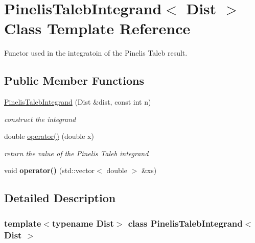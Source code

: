 \hypertarget{classPinelisTalebIntegrand}{}\section{Pinelis\+Taleb\+Integrand$<$ Dist $>$ Class Template Reference}
\label{classPinelisTalebIntegrand}


Functor used in the integratoin of the Pinelis Taleb result.  


\subsection*{Public Member Functions}
\begin{DoxyCompactItemize}
\item 
\mbox{\hyperlink{classPinelisTalebIntegrand_a4122d67af083c9b7f38cc94ed85e99f7}{Pinelis\+Taleb\+Integrand}} (Dist \&dist, const int n)
\begin{DoxyCompactList}\small\item\em construct the integrand \end{DoxyCompactList}\item 
\mbox{\label{classPinelisTalebIntegrand_a065e7c917d79d417efaf2185a343031d}} 
double \mbox{\hyperlink{classPinelisTalebIntegrand_a065e7c917d79d417efaf2185a343031d}{operator()}} (double x)
\begin{DoxyCompactList}\small\item\em return the value of the Pinelis Taleb integrand \end{DoxyCompactList}\item 
\mbox{\label{classPinelisTalebIntegrand_a2c46e6c2f8b63b6deb45b8be5c1b81e5}} 
void {\bfseries operator()} (std\+::vector$<$ double $>$ \&xs)
\end{DoxyCompactItemize}


\subsection{Detailed Description}
\subsubsection*{template$<$typename Dist$>$\newline
class Pinelis\+Taleb\+Integrand$<$ Dist $>$}

